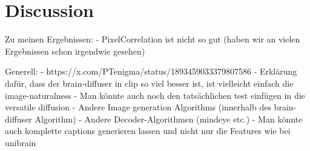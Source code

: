 \chapter{Discussion}


Zu meinen Ergebnissen:
- PixelCorrelation ist nicht so gut (haben wir an vielen Ergebnissen schon irgendwie gesehen)


Generell:
- https://x.com/PTenigma/status/1893459033379807586
- Erklärung dafür, dass der brain-diffuser in clip so viel besser ist, ist vielleicht einfach die image-naturalness
- Man könnte auch noch den tatsächlichen test einfügen in die versatile diffusion
- Andere Image generation Algorithms (innerhalb des brain-diffuser Algorithm)
- Andere Decoder-Algorithmen (mindeye etc.)
    - Man könnte auch komplette captions generieren lassen und nicht nur die Features wie bei unibrain \cite{maiUniBrainUnifyImage2023}
